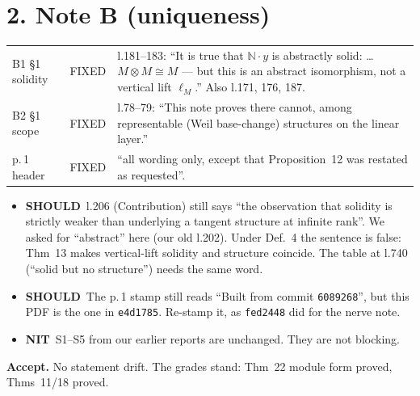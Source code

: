 \documentclass[10pt]{article}
\newcommand{\SH}{\textbf{SHOULD}}
\newcommand{\NI}{\textbf{NIT}}
\begin{document}
\section*{2. Note B (uniqueness)}
\begin{tabular}{p{2.2cm}p{1.5cm}p{12.5cm}}
\toprule
B1 \S1 solidity & FIXED & l.181--183: ``It is true that $\mathbb N\cdot y$ is abstractly solid: \dots\ $M\otimes M\cong M$ --- but this is an
abstract isomorphism, not a vertical lift $\ell_M$.'' Also l.171, 176, 187.\\
B2 \S1 scope & FIXED & l.78--79: ``This note proves there cannot, among representable (Weil base-change) structures on
the linear layer.''\\
p.\,1 header & FIXED & ``all wording only, except that Proposition~12 was restated as requested''.\\
\bottomrule
\end{tabular}
\begin{itemize}
\item \SH\ l.206 (Contribution) still says ``the observation that solidity is strictly weaker than underlying a
tangent structure at infinite rank''. We asked for ``abstract'' here (our old l.202). Under Def.~4 the sentence
is false: Thm~13 makes vertical-lift solidity and structure coincide. The table at l.740 (``solid but no
structure'') needs the same word.
\item \SH\ The p.\,1 stamp still reads ``Built from commit \texttt{6089268}'', but this PDF is the one in
\texttt{e4d1785}. Re-stamp it, as \texttt{fed2448} did for the nerve note.
\item \NI\ S1--S5 from our earlier reports are unchanged. They are not blocking.
\end{itemize}
\textbf{Accept.} No statement drift. The grades stand: Thm~22 module form proved, Thms~11/18 proved.
\end{document}
